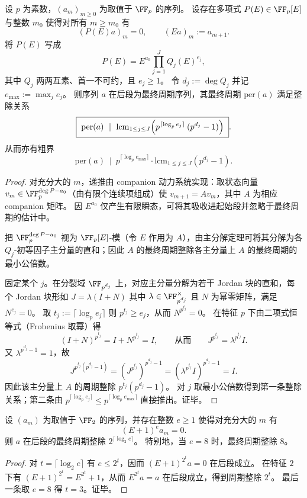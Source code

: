 \begin{proposition}\label{prop:conclusion-finitefield-jordan-exponent-period-bound}
设 \(p\) 为素数，\((a_m)_{m\ge 0}\) 为取值于 \(\FF_p\) 的序列。
设存在多项式 \(P(E)\in\FF_p[E]\) 与整数 \(m_0\) 使得对所有 \(m\ge m_0\) 有
\[
(P(E)a)_m=0,
\qquad
(Ea)_m:=a_{m+1}.
\]
将 \(P(E)\) 写成
\[
P(E)=E^{a_0}\prod_{j=1}^{J}Q_j(E)^{e_j},
\]
其中 \(Q_j\) 两两互素、首一不可约，且 \(e_j\ge 1\)。
令 \(d_j:=\deg Q_j\) 并记 \(e_{\max}:=\max_j e_j\)。
则序列 \(a\) 在后段为最终周期序列，其最终周期 \(\mathrm{per}(a)\) 满足整除关系
\[
\boxed{\;
\mathrm{per}(a)\ \mid\ \mathrm{lcm}_{1\le j\le J}\Bigl(p^{\lceil\log_p e_j\rceil}\,(p^{d_j}-1)\Bigr)\; }.
\]
从而亦有粗界
\[
\boxed{\;
\mathrm{per}(a)\ \mid\ p^{\lceil\log_p e_{\max}\rceil}\cdot \mathrm{lcm}_{1\le j\le J}(p^{d_j}-1).\;}
\]
\end{proposition}
\begin{proof}
对充分大的 \(m\)，递推由 companion 动力系统实现：取状态向量 \(v_m\in\FF_p^{\deg P-a_0}\)（由有限个连续项组成）使 \(v_{m+1}=Av_m\)，其中 \(A\) 为相应 companion 矩阵。
因 \(E^{a_0}\) 仅产生有限瞬态，可将其吸收进起始段并忽略于最终周期的估计中。
\par
把 \(\FF_p^{\deg P-a_0}\) 视为 \(\FF_p[E]\)-模（令 \(E\) 作用为 \(A\)），由主分解定理可将其分解为各 \(Q_j\)-初等因子主分量的直和；因此 \(A\) 的最终周期整除各主分量上 \(A\) 的最终周期的最小公倍数。
\par
固定某个 \(j\)。在分裂域 \(\FF_{p^{d_j}}\) 上，对应主分量分解为若干 Jordan 块的直和，每个 Jordan 块形如
\(
J=\lambda(I+N)
\)
其中 \(\lambda\in\FF_{p^{d_j}}^\times\) 且 \(N\) 为幂零矩阵，满足 \(N^{e_j}=0\)。
取 \(t_j:=\lceil\log_p e_j\rceil\) 则 \(p^{t_j}\ge e_j\)，从而 \(N^{p^{t_j}}=0\)。
在特征 \(p\) 下由二项式恒等式（Frobenius 取幂）得
\[
(I+N)^{p^{t_j}}=I+N^{p^{t_j}}=I,
\qquad\text{从而}\qquad
J^{p^{t_j}}=\lambda^{p^{t_j}}I.
\]
又 \(\lambda^{p^{d_j}-1}=1\)，故
\[
J^{p^{t_j}(p^{d_j}-1)}=(J^{p^{t_j}})^{p^{d_j}-1}=(\lambda^{p^{t_j}}I)^{p^{d_j}-1}=I.
\]
因此该主分量上 \(A\) 的周期整除 \(p^{t_j}(p^{d_j}-1)\)。
对 \(j\) 取最小公倍数得到第一条整除关系；第二条由 \(p^{\lceil\log_p e_j\rceil}\le p^{\lceil\log_p e_{\max}\rceil}\) 直接推出。证毕。
\end{proof}

\begin{corollary}\label{cor:conclusion-mod2-eplus1-power-period}
设 \((a_m)\) 为取值于 \(\FF_2\) 的序列，并存在整数 \(e\ge 1\) 使得对充分大的 \(m\) 有
\[
(E+1)^e a_m=0.
\]
则 \(a\) 在后段的最终周期整除 \(2^{\lceil\log_2 e\rceil}\)。
特别地，当 \(e=8\) 时，最终周期整除 \(8\)。
\end{corollary}
\begin{proof}
对 \(t=\lceil\log_2 e\rceil\) 有 \(e\le 2^{t}\)，因而 \((E+1)^{2^{t}}a=0\) 在后段成立。
在特征 \(2\) 下有 \((E+1)^{2^{t}}=E^{2^{t}}+1\)，从而 \(E^{2^{t}}a=a\) 在后段成立，得到周期整除 \(2^{t}\)。
最后一条取 \(e=8\) 得 \(t=3\)。证毕。
\end{proof}

